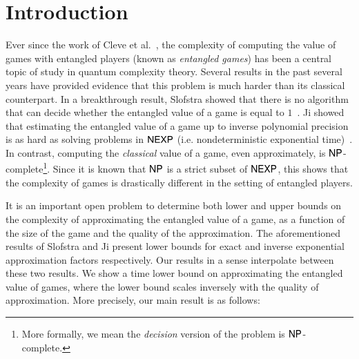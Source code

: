 \section{Introduction}

Ever since the work of Cleve et al.~\cite{cleve2004consequences}, the complexity of computing the value of games with entangled players (known as \emph{entangled games}) has been a central topic of study in quantum complexity theory. Several results in the past several years have provided evidence that this problem is much harder than its classical counterpart. In a breakthrough result, Slofstra showed that there is no algorithm that can decide whether the entangled value of a game is equal to $1$~\cite{slofstra2017set}. Ji showed that estimating the entangled value of a game up to inverse polynomial precision is as hard as solving problems in ${\sf NEXP}$ (i.e. nondeterministic exponential time)~\cite{ji2016compression}. In contrast, computing the \emph{classical} value of a game, even approximately, is ${\sf NP}$-complete\footnote{More formally, we mean the \emph{decision} version of the problem is ${\sf NP}$-complete.}. Since it is known that ${\sf NP}$ is a strict subset of ${\sf NEXP}$, this shows that the complexity of games is drastically different in the setting of entangled players. 

It is an important open problem to determine both lower and upper bounds on the complexity of approximating the entangled value of a game, as a function of the size of the game and the quality of the approximation.
The aforementioned results of Slofstra and Ji present lower bounds for exact and inverse exponential approximation factors respectively. Our results in a sense interpolate between these two results. We show a time lower bound on approximating the entangled value of games, where the lower bound scales inversely with the quality of approximation. More precisely, our main result is as follows:

